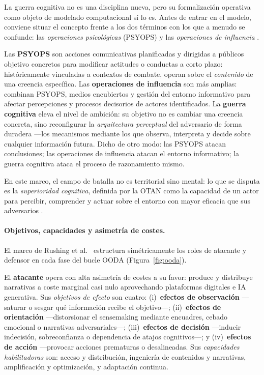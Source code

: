 La guerra cognitiva no es una disciplina nueva, pero su formalización operativa como objeto de modelado computacional sí lo es.
Antes de entrar en el modelo, conviene situar el concepto frente a los dos términos con los que a menudo se confunde: las \emph{operaciones psicológicas} (PSYOPS) y las \emph{operaciones de influencia} \cite{RushingHerschXu2026, DeppeSchaal2024}.

Las \textbf{PSYOPS} son acciones comunicativas planificadas y dirigidas a públicos objetivo concretos para modificar actitudes o conductas a corto plazo: históricamente vinculadas a contextos de combate, operan sobre el \emph{contenido} de una creencia específica.
Las \textbf{operaciones de influencia} son más amplias: combinan PSYOPS, medios encubiertos y gestión del entorno informativo para afectar percepciones y procesos decisorios de actores identificados.
La \textbf{guerra cognitiva} eleva el nivel de ambición: su objetivo no es cambiar una creencia concreta, sino reconfigurar la \emph{arquitectura perceptual} del adversario de forma duradera ---los mecanismos mediante los que observa, interpreta y decide sobre cualquier información futura.
Dicho de otro modo: las PSYOPS atacan conclusiones; las operaciones de influencia atacan el entorno informativo; la guerra cognitiva ataca el proceso de razonamiento mismo.

En este marco, el campo de batalla no es territorial sino mental: lo que se disputa es la \emph{superioridad cognitiva}, definida por la OTAN como la capacidad de un actor para percibir, comprender y actuar sobre el entorno con mayor eficacia que sus adversarios \cite{NATOChiefScientist2025}.

\paragraph{Objetivos, capacidades y asimetría de costes.}
El marco de Rushing et al.\ \cite{RushingHerschXu2026} estructura simétricamente los roles de atacante y defensor en cada fase del bucle OODA (Figura~\ref{fig:ooda}).

El \textbf{atacante} opera con alta asimetría de costes a su favor: produce y distribuye narrativas a coste marginal casi nulo aprovechando plataformas digitales e IA generativa.
Sus \emph{objetivos de efecto} son cuatro: (i)~\textbf{efectos de observación} ---saturar o sesgar qué información recibe el objetivo---; (ii)~\textbf{efectos de orientación} ---distorsionar el sensemaking mediante encuadres, cebado emocional o narrativas adversariales---; (iii)~\textbf{efectos de decisión} ---inducir indecisión, sobreconfianza o dependencia de atajos cognitivos---; y (iv)~\textbf{efectos de acción} ---provocar acciones prematuras o desalineadas.
Sus \emph{capacidades habilitadoras} son: acceso y distribución, ingeniería de contenidos y narrativas, amplificación y optimización, y adaptación continua.

